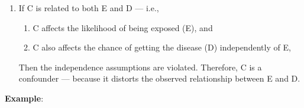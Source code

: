 \begin{enumerate}
\begin{enumerate}
        \item If C is related to both E and D — i.e.,
        \hfill \cite{common/online/chatgpt}
        \begin{enumerate}
            \item C affects the likelihood of being exposed (E), and
            \hfill \cite{common/online/chatgpt}

            \item C also affects the chance of getting the disease (D) independently of E,
            \hfill \cite{common/online/chatgpt}
        \end{enumerate}
        Then the independence assumptions are violated. Therefore, C is a confounder — because it distorts the observed relationship between E and D.
        \hfill \cite{common/online/chatgpt}
    \end{enumerate}
\end{enumerate}

\textbf{Example}:

